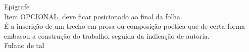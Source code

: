 
\vspace*{18.5cm}
\hspace{0.4\textwidth}
\begin{varwidth}{0.5\textwidth}
  \leading{5mm}
  \raggedleft
  Epígrafe\\
  Item OPCIONAL, deve ficar posicionado ao final da folha.\\
  É a inscrição de um trecho em prosa ou composição poética que de certa forma
  embasou a construção do trabalho, seguida da indicação de autoria.\\
  Fulano de tal
\end{varwidth}

